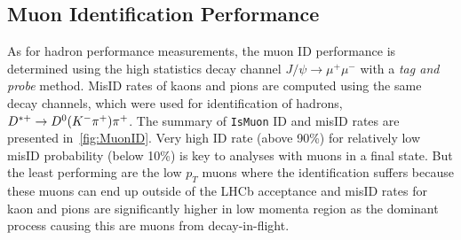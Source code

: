 \subsection{Muon Identification Performance}
\label{muonperf}
As for hadron performance measurements, the muon ID performance is determined using the high statistics decay channel $J/\psi \rightarrow \mu^{+} \mu^{-}$ with a \textit{tag and probe} method. MisID rates of kaons and pions are computed using the same decay channels, which were used for identification of hadrons, $D^{*+} \rightarrow D^{0}({K}^{-}{{\pi}^+}){{\pi}^+}$. The summary of \texttt{IsMuon} ID and misID rates are presented in~\autoref{fig:MuonID}. Very high ID rate (above 90\%) for relatively low misID probability (below 10\%) is key to analyses with muons in a final state. But the least performing are the low $p_{T}$ muons where the identification suffers because these muons can end up outside of the \gls{LHCb} acceptance and misID rates for kaon and pions are significantly higher in low momenta region as the dominant process causing this are muons from decay-in-flight.   

